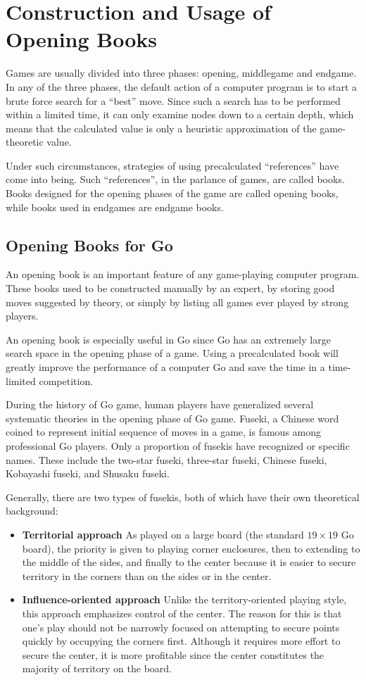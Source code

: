 \section{Construction and Usage of Opening Books}

Games are usually divided into three phases: opening, middlegame and endgame. In any of the three phases, the default action of a computer program is to start a brute force search for a ``best'' move. Since such a search has to be performed within a limited time, it can only examine nodes down to a certain depth, which means that the calculated value is only a heuristic approximation of the game-theoretic value.

Under such circumstances, strategies of using precalculated ``references'' have come into being. Such ``references'', in the parlance of games, are called books. Books designed for the opening phases of the game are called opening books, while books used in endgames are endgame books.


\subsection{Opening Books for Go}

An opening book is an important feature of any game-playing computer program. These books used to be constructed manually by an expert, by storing good moves suggested by theory, or simply by listing all games ever played by
strong players.

An opening book is especially useful in Go since Go has an extremely large search space in the opening phase of a game. Using a precalculated book will greatly improve the performance of a computer Go and save the time in a time-limited competition.

During the history of Go game, human players have generalized several systematic theories in the opening phase of Go game. Fuseki, a Chinese word coined to represent initial sequence of moves in a game, is famous among professional Go players. Only a proportion of fusekis have recognized or specific names. These include the two-star fuseki, three-star fuseki, Chinese fuseki, Kobayashi fuseki, and Shusaku fuseki.

Generally, there are two types of fusekis, both of which have their own theoretical background:
\begin{itemize}
\item \textbf{Territorial approach}
As played on a large board (the standard $19 \times 19$ Go board), the priority is given to playing corner enclosures, then to extending to the middle of the sides, and finally to the center because it is easier to secure territory in the corners than on the sides or in the center.
\item \textbf{Influence-oriented approach}
Unlike the territory-oriented playing style, this approach emphasizes control of the center. The reason for this is that one's play should not be narrowly focused on attempting to secure points quickly by occupying the corners first. Although it requires more effort to secure the center, it is more profitable since the center constitutes the majority of territory on the board.
\end{itemize}

